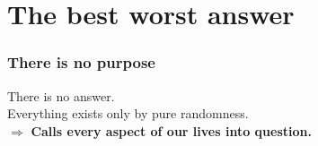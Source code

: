\documentclass{beamer}
\begin{document}
    \section{The best worst answer}
    
    \begin{frame}
    		\frametitle{There is no purpose}
    		There is no answer. \\
    		Everything exists only by pure randomness. \\
    		$\Rightarrow$ \textbf{Calls every aspect of our lives into question.}
    		
    \end{frame}
    
\end{document}
